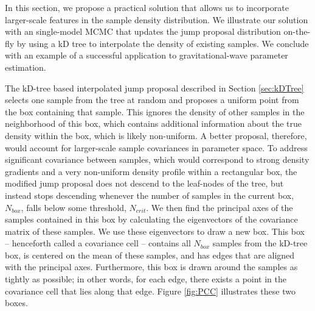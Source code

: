\documentclass{rsos}
\begin{document}
In this section, we propose a practical solution that allows us to incorporate larger-scale features in the sample density distribution.  We illustrate our solution with an single-model MCMC that updates the jump proposal distribution on-the-fly by using a kD tree to interpolate the density of existing samples.  We conclude with an example of a successful application to gravitational-wave parameter estimation.

The kD-tree based interpolated jump proposal described in Section \ref{sec:kDTree} selects one sample from the tree at random and proposes a uniform point from the box containing that sample.  This ignores the density of other samples in the neighborhood of this box, which contains additional information about the true density within the box, which is likely non-uniform.  A better proposal, therefore, would account for larger-scale sample covariances in parameter space.  To address significant covariance between samples, which would correspond to strong density gradients and a very non-uniform density profile within a rectangular box, the modified jump proposal does not descend to the leaf-nodes of the tree, but instead stops descending whenever the number of samples in the current box, $N_{box}$, falls below some threshold, $N_{crit}$. We then find the principal axes of the samples
contained in this box by calculating the eigenvectors of the covariance matrix of these samples. We use these eigenvectors to draw a new box. This box -- henceforth called a covariance cell -- contains all $N_{box}$ samples from the kD-tree box, is centered on the mean of these samples, and has edges that are aligned with the principal axes. Furthermore, this box is drawn around the samples as tightly as possible; in other words, for each edge, there exists a point in the covariance cell that lies along that edge. Figure \ref{fig:PCC} illustrates these two boxes.
\end{document}
